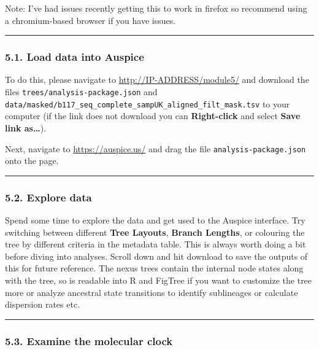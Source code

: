 \documentclass[
]{book}
\begin{document}
Note: I've had issues recently getting this to work in firefox so recommend using a chromium-based browser if you have issues.

\begin{center}\rule{0.5\linewidth}{0.5pt}\end{center}

\subsubsection{5.1. Load data into Auspice}\label{load-data-into-auspice}

To do this, please navigate to \url{http://IP-ADDRESS/module5/} and download the files \texttt{trees/analysis-package.json} and \texttt{data/masked/b117\_seq\_complete\_sampUK\_aligned\_filt\_mask.tsv} to your computer (if the link does not download you can \textbf{Right-click} and select \textbf{Save link as\ldots{}}).

Next, navigate to \url{https://auspice.us/} and drag the file \texttt{analysis-package.json} onto the page.

\begin{center}\rule{0.5\linewidth}{0.5pt}\end{center}

\subsubsection{5.2. Explore data}\label{explore-data}

Spend some time to explore the data and get used to the Auspice interface. Try switching between different \textbf{Tree Layouts}, \textbf{Branch Lengths}, or colouring the tree by different criteria in the metadata table. This is always worth doing a bit before diving into analyses. Scroll down and hit download to save the outputs of this for future reference. The nexus trees contain the internal node states along with the tree, so is readable into R and FigTree if you want to customize the tree more or analyze ancestral state transitions to identify sublineages or calculate dispersion rates etc.

\begin{center}\rule{0.5\linewidth}{0.5pt}\end{center}

\subsubsection{5.3. Examine the molecular clock}\label{examine-the-molecular-clock}
\end{document}
